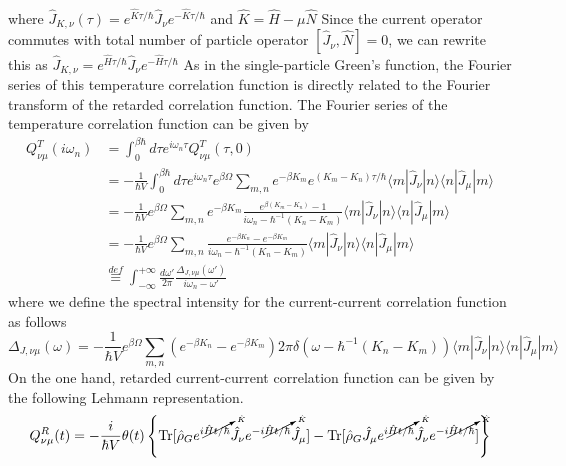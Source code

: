 where $\hat J_{K,\nu}(\tau)=e^{\hat{K}\tau/\hbar}\hat J_\nu e^{-\hat{K}\tau/\hbar}$
and $\hat K=\hat H-\mu \hat N$
 Since the current operator commutes with total number of particle operator $[\hat J_\nu,\hat N]=0$, we can rewrite this as $\hat J_{K,\nu}=e^{\hat H\tau/\hbar}\hat J_\nu e^{-\hat H\tau/\hbar}$
 As in the single-particle Green's function, the Fourier series of this temperature correlation function is directly related to the Fourier transform of the retarded correlation function.
 The Fourier series of the temperature correlation function can be given by
\begin{equation}\label{eq4.8.19}
\begin{aligned}
Q^T_{\nu\mu}(i\omega_n)&=\int_0^{\beta\hbar} d\tau e^{i\omega_n \tau} Q^T_{\nu\mu}(\tau,0)\\
&=-\frac{1}{\hbar V} \int_0^{\beta\hbar} d\tau e^{i\omega_n \tau} e^{\beta\Omega} \sum_{m,n} e^{-\beta K_m} e^{(K_m-K_n)\tau/\hbar} \langle m|\hat J_\nu|n\rangle \langle n| \hat J_\mu|m\rangle\\
&=-\frac{1}{\hbar V} e^{\beta\Omega} \sum_{m,n} e^{-\beta K_m} \frac{e^{\beta(K_m-K_n)}-1}{i\omega_n-\hbar^{-1}(K_n-K_m)} \langle m|\hat J_\nu|n\rangle \langle n| \hat J_\mu|m\rangle\\
&=-\frac{1}{\hbar V} e^{\beta\Omega} \sum_{m,n} \frac{e^{-\beta K_n}-e^{-\beta K_m}}{i\omega_n-\hbar^{-1}(K_n-K_m)} \langle m|\hat J_\nu|n\rangle \langle n| \hat J_\mu|m\rangle\\
&\overset{def}{\equiv} \int_{-\infty}^{+\infty}\frac{d\omega'}{2\pi} \frac{\Delta_{J,\nu\mu}(\omega')}{i\omega_n-\omega'}
\end{aligned}
\end{equation}
where we define the spectral intensity for the current-current correlation function as follows
\begin{equation}
\Delta_{J,\nu\mu}(\omega)=-\frac{1}{\hbar V} e^{\beta\Omega} \sum_{m,n} \left( e^{-\beta K_n}-e^{-\beta K_m} \right) 2\pi \delta(\omega-\hbar^{-1}(K_n-K_m)) \langle m|\hat J_\nu|n\rangle \langle n| \hat J_\mu|m\rangle
\end{equation}
 On the one hand, retarded current-current correlation function can be given by the following Lehmann representation.
\begin{equation}
Q^R_{\nu\mu}(t)=-\frac{i}{\hbar V} \theta(t) \left\{ \text{Tr}[\hat \rho_G e^{i\cancelto{\hat K}{\hat Ht/\hbar}} \hat J_\nu e^{-i\cancelto{\hat K}{\hat Ht/\hbar}} \hat J_\mu]- \text{Tr}[\hat \rho_G \hat J_\mu e^{i\cancelto{\hat K}{\hat Ht/\hbar}} \hat J_\nu e^{-i\cancelto{\hat K}{\hat Ht/\hbar}} ] \right\}
\end{equation}
